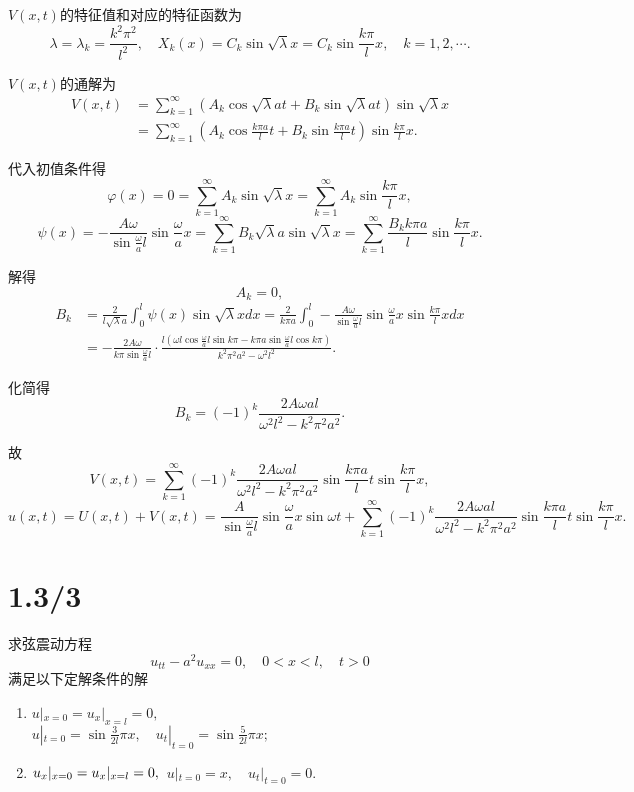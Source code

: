 \documentclass[11pt,a4paper]{article}
\begin{document}
$V(x,t)$的特征值和对应的特征函数为
$$\lambda=\lambda_k=\frac{k^2\pi^2}{l^2},\quad X_k(x)=C_k\sin\sqrt{\lambda}x=C_k\sin\frac{k\pi}{l}x,\quad k=1,2,\cdots.$$

$V(x,t)$的通解为
\begin{align*}
  V(x,t)
   & =\sum_{k=1}^\infty\left(A_k\cos\sqrt{\lambda}at+
  B_k\sin\sqrt{\lambda}at\right)\sin\sqrt{\lambda}x    \\
   & =\sum_{k=1}^\infty\left(A_k\cos\frac{k\pi a}{l}t+
  B_k\sin\frac{k\pi a}{l}t\right)\sin\frac{k\pi}{l}x.
\end{align*}

代入初值条件得
$$\varphi(x)=0=\sum_{k=1}^\infty A_k\sin\sqrt{\lambda}x=\sum_{k=1}^\infty A_k\sin\frac{k\pi }{l}x,$$
$$\psi(x)=-\frac{A\omega}{\sin\frac{\omega}{a}l}\sin\frac{\omega}{a}x=\sum_{k=1}^\infty B_k\sqrt{\lambda}a\sin\sqrt{\lambda}x=\sum_{k=1}^\infty \frac{B_kk\pi a}{l}\sin\frac{k\pi}{l}x.$$

解得
$$A_k=0,$$
\begin{align*}
  B_k & =\frac{2}{l\sqrt{\lambda}a}\int_0^l\psi(x)\sin\sqrt{\lambda}xdx=
  \frac{2}{k\pi a}\int_0^l -\frac{A\omega}{\sin\frac{\omega}{a}l}\sin\frac{\omega}{a}x\sin\frac{k\pi}{l}xdx                                                                         \\
      & =-\frac{2A\omega}{k\pi\sin\frac{\omega}{a}l}\cdot\frac{l\left(\omega l\cos\frac{\omega}{a}l\sin k\pi-k\pi a\sin\frac{\omega}{a}l\cos k\pi\right)}{k^2\pi^2a^2-\omega^2l^2}.
\end{align*}

化简得
$$B_k=(-1)^k\frac{2A\omega al}{\omega^2l^2-k^2\pi^2a^2}.$$

故
$$V(x,t)=\sum_{k=1}^\infty(-1)^k\frac{2A\omega al}{\omega^2l^2-k^2\pi^2a^2}\sin\frac{k\pi a}{l}t\sin\frac{k\pi}{l}x,$$
$$u(x,t)=U(x,t)+V(x,t)=\frac{A}{\sin\frac{\omega}{a}l}\sin\frac{\omega}{a}x\sin\omega t+\sum_{k=1}^\infty(-1)^k\frac{2A\omega al}{\omega^2l^2-k^2\pi^2a^2}\sin\frac{k\pi a}{l}t\sin\frac{k\pi}{l}x.$$

\section{1.3/3}
\begin{problem}
求弦震动方程
$$u_{tt}-a^2u_{xx}=0, \quad 0<x<l,\quad t>0$$
满足以下定解条件的解
\begin{enumerate}
  \item $u|_{x=0}=u_x|_{x=l}=0,$\\
        $u|_{t=0}=\sin\frac{3}{2l}\pi x,\quad u_t|_{t=0}=\sin\frac{5}{2l}\pi x;$
  \item $u_x|_{x=0}=u_x|_{x=l}=0,\\$
        $u|_{t=0}=x,\quad u_t|_{t=0}=0.$
\end{enumerate}
\end{problem}
\end{document}
